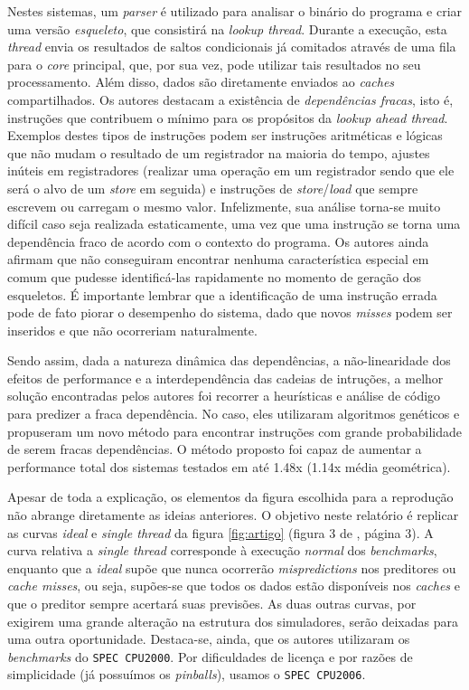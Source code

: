 \documentclass[12pt]{article}
\begin{document}
Nestes sistemas, um \textit{parser} é utilizado para analisar o binário do
programa e criar uma versão \textit{esqueleto}, que consistirá na
\textit{lookup thread}. Durante a execução, esta \textit{thread} envia os
resultados de saltos condicionais já comitados através de uma fila para o
\textit{core} principal, que, por sua vez, pode utilizar tais resultados no seu
processamento. Além disso, dados são diretamente enviados ao \textit{caches}
compartilhados. Os autores destacam a existência de \textit{dependências
fracas}, isto é, instruções que contribuem o mínimo para os propósitos da
\textit{lookup ahead thread}. Exemplos destes tipos de instruções podem ser
instruções aritméticas e lógicas que não mudam o resultado de um registrador na
maioria do tempo, ajustes inúteis em registradores (realizar uma operação em um
registrador sendo que ele será o alvo de um \textit{store} em seguida) e
instruções de \textit{store}/\textit{load} que sempre escrevem ou carregam o
mesmo valor. Infelizmente, sua análise torna-se muito difícil caso seja
realizada estaticamente, uma vez que uma instrução se torna uma dependência
fraco de acordo com o contexto do programa. Os autores ainda afirmam que não
conseguiram encontrar nenhuma característica especial em comum que pudesse
identificá-las rapidamente no momento de geração dos esqueletos. É importante
lembrar que a identificação de uma instrução errada pode de fato piorar o
desempenho do sistema, dado que novos \textit{misses} podem ser inseridos e
que não ocorreriam naturalmente.

Sendo assim, dada a natureza dinâmica das dependências, a não-linearidade dos
efeitos de performance e a interdependência das cadeias de intruções, a melhor
solução encontradas pelos autores foi recorrer a heurísticas e análise de código
para predizer a fraca dependência. No caso, eles utilizaram algoritmos genéticos
e propuseram um novo método para encontrar instruções com grande probabilidade de
serem fracas dependências. O método proposto foi capaz de aumentar a performance
total dos sistemas testados em até 1.48x (1.14x média geométrica).

Apesar de toda a explicação, os elementos da figura escolhida para a reprodução
não abrange diretamente as ideias anteriores. O objetivo neste relatório é
replicar as curvas \textit{ideal} e \textit{single thread} da figura
\ref{fig:artigo} (figura 3 de \cite{artigo}, página 3). A curva relativa a
\textit{single thread} corresponde à execução \textit{normal} dos \textit{benchmarks}, enquanto
que a \textit{ideal} supõe que nunca ocorrerão \textit{mispredictions} nos
preditores ou \textit{cache misses}, ou seja, supões-se que todos os dados estão
disponíveis nos \textit{caches} e que o preditor sempre acertará suas previsões.
As duas outras curvas, por exigirem uma grande alteração na estrutura dos
simuladores, serão deixadas para uma outra oportunidade. Destaca-se, ainda, que
os autores utilizaram os \textit{benchmarks} do \texttt{SPEC CPU2000}. Por
dificuldades de licença e por razões de simplicidade (já possuímos os
\textit{pinballs}), usamos o \texttt{SPEC CPU2006}.
\end{document}
